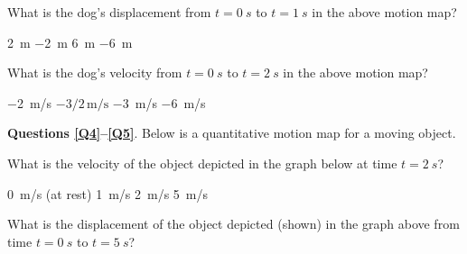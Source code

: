 \documentclass[]{exam}
\begin{document}
\begin{questions}
\question \label{Q2}
What is the dog's displacement from $t=\SI{0}{s}$ to $t=\SI{1}{s}$ in the above motion map?

\begin{randomizechoices}[norandomize]
    \choice \SI{2}{m}
    \correctchoice \SI{-2}{m}
    \choice \SI{6}{m}
    \choice \SI{-6}{m}
\end{randomizechoices}

\question \label{Q3}
What is the dog's velocity from $t=\SI{0}{s}$ to $t=\SI{2}{s}$ in the above motion map?

\begin{randomizechoices}[norandomize]
    \correctchoice \SI{-2}{m/s}
    \choice $-3/2\,\mathrm{m/s}$
    \choice \SI{-3}{m/s}
    \choice \SI{-6}{m/s}
\end{randomizechoices}


\begin{EnvUplevel}
    \textbf{Questions \ref{Q4}--\ref{Q5}}. Below is a quantitative motion map for a moving object. 
\end{EnvUplevel}

\begin{center}
\end{center}

\question \label{Q4}
What is the velocity of the object depicted in the graph below at time $t=\SI{2}{s}$?

\begin{randomizechoices}[norandomize]
    \choice \SI{0}{m/s} (at rest)
    \choice \SI{1}{m/s}
    \correctchoice \SI{2}{m/s}
    \choice \SI{5}{m/s}
\end{randomizechoices}

\question \label{Q5}
What is the displacement of the object depicted (shown) in the graph above from time $t=\SI{0}{s}$ to $t=\SI{5}{s}$?


\end{questions}
\end{document}
